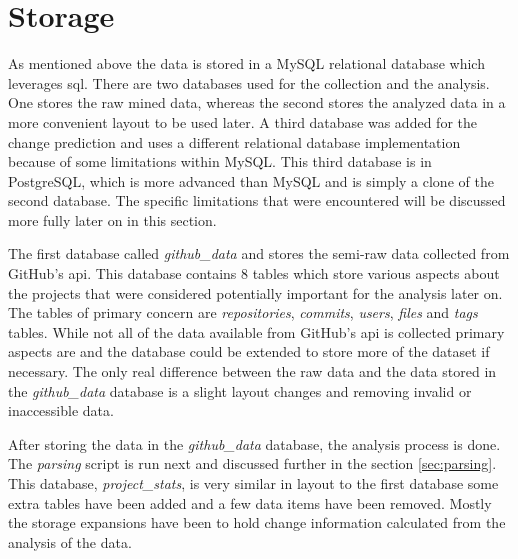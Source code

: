 
\section{Storage}

As mentioned above the data is stored in a MySQL relational database which leverages \gls{sql}. There are two databases used for the collection and the analysis. One stores the raw mined data, whereas the second stores the analyzed data in a more convenient layout to be used later. A third database was added for the change prediction and uses a different relational database implementation because of some limitations within MySQL. This third database is in PostgreSQL, which is more advanced than MySQL and is simply a clone of the second database. The specific limitations that were encountered will be discussed more fully later on in this section.


The first database called \textit{github\_data} and stores the semi-raw data collected from GitHub's \gls{api}. This database contains 8 tables which store various aspects about the projects that were considered potentially important for the analysis later on. The tables of primary concern are \textit{repositories}, \textit{commits}, \textit{users}, \textit{files} and \textit{tags} tables. While not all of the data available from GitHub's \gls{api} is collected primary aspects are and the database could be extended to store more of the dataset if necessary. The only real difference between the raw data and the data stored in the \textit{github\_data} database is a slight layout changes and removing invalid or inaccessible data.

After storing the data in the \textit{github\_data} database, the analysis process is done. The \textit{parsing} script is run next and discussed further in the section \ref{sec:parsing}. This database, \textit{project\_stats}, is very similar in layout to the first database some extra tables have been added and a few data items have been removed. Mostly the storage expansions have been to hold change information calculated from the analysis of the data.

